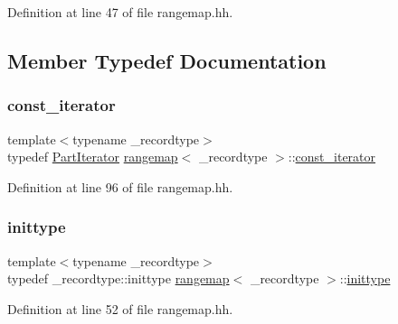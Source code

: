 Definition at line 47 of file rangemap.\+hh.



\subsection{Member Typedef Documentation}
\mbox{\label{classrangemap_affa7462e68d053d3a066fe0b8d46a99d}} 
\subsubsection{\texorpdfstring{const\_iterator}{const\_iterator}}
{\footnotesize\ttfamily template$<$typename \+\_\+recordtype$>$ \\
typedef \mbox{\hyperlink{classrangemap_1_1_part_iterator}{Part\+Iterator}} \mbox{\hyperlink{classrangemap}{rangemap}}$<$ \+\_\+recordtype $>$\+::\mbox{\hyperlink{classrangemap_affa7462e68d053d3a066fe0b8d46a99d}{const\+\_\+iterator}}}



Definition at line 96 of file rangemap.\+hh.

\mbox{\label{classrangemap_a995e3cdf45bcbbb27c59982353b2256b}} 
\subsubsection{\texorpdfstring{inittype}{inittype}}
{\footnotesize\ttfamily template$<$typename \+\_\+recordtype$>$ \\
typedef \+\_\+recordtype\+::inittype \mbox{\hyperlink{classrangemap}{rangemap}}$<$ \+\_\+recordtype $>$\+::\mbox{\hyperlink{classrangemap_a995e3cdf45bcbbb27c59982353b2256b}{inittype}}}



Definition at line 52 of file rangemap.\+hh.

\mbox{\label{classrangemap_a54c8f7622f9af4c4232d764cf9ed11fa}} 
